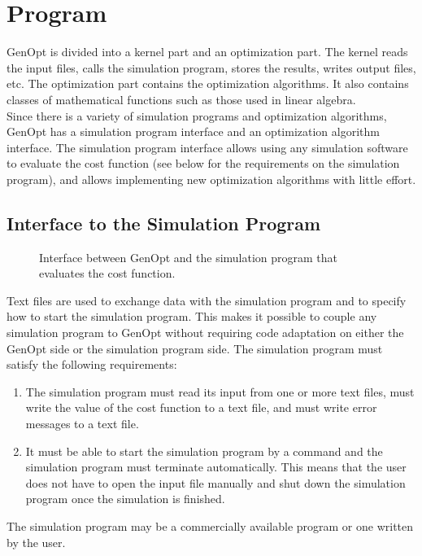 \chapter{Program}
\label{sec:proIns}
GenOpt is divided into a kernel part and an optimization part.
The kernel reads the input files,
calls the simulation program,
stores the results,
writes output files, etc.
The optimization part contains the optimization algorithms.
It also contains classes of mathematical functions such as those used in linear algebra.\\

Since there is a variety of simulation programs and optimization algorithms, 
GenOpt has a simulation program interface and an optimization algorithm interface.
The simulation program interface allows using any simulation software to evaluate the cost function (see below for the requirements on the simulation program), and
allows implementing new optimization algorithms with little effort.

\section{Interface to the Simulation Program}
\begin{figure}
\centering
\scalebox{0.8}{  }
\caption{Interface between GenOpt and the simulation program that evaluates the cost function.}
\end{figure}

Text files are used to exchange data with the simulation program and to specify how 
to start the simulation program.
This makes it possible to couple any simulation program to GenOpt without requiring code adaptation on either the GenOpt side or the simulation program side.
The simulation program must satisfy the following requirements:
\begin{enumerate}
\label{lis:simProIntReq}
\item 
The simulation program must read its input from one or more text files,
must write the value of the cost function to a text file, 
and must write error messages to a text file.
\item
It must be able to start the simulation program by a command and 
the simulation program must terminate automatically.
This means that the user does not have to open the input file manually 
and shut down the simulation program once the simulation is finished.
\end{enumerate}

The simulation program may be a commercially available program or one written by the user.

